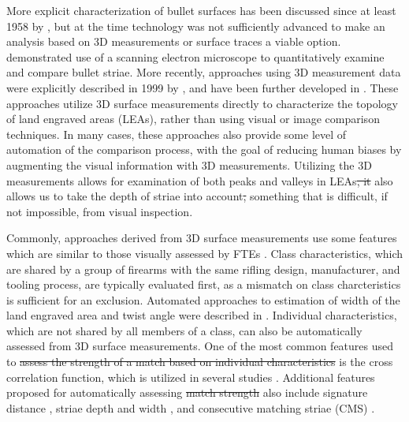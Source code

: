 \documentclass[doubleblind]{elsarticle}\usepackage[]{graphicx}\usepackage[]{color}
\providecommand{\DIFaddtex}[1]{{\protect\color{blue}\uwave{#1}}} %
\providecommand{\DIFdeltex}[1]{{\protect\color{red}\sout{#1}}}                      %
\providecommand{\DIFaddbegin}{} %
\providecommand{\DIFaddend}{} %
\providecommand{\DIFdelbegin}{} %
\providecommand{\DIFdelend}{} %
\providecommand{\DIFadd}[1]{\texorpdfstring{\DIFaddtex{#1}}{#1}} %
\providecommand{\DIFdel}[1]{\texorpdfstring{\DIFdeltex{#1}}{}} %
\newcommand{\DIFscaledelfig}{0.5}
\newlength{\DIFdelgraphicswidth} %
\newlength{\DIFdelgraphicsheight} %
\newcommand{\DIFaddincludegraphics}[2][]{{\color{blue}\fbox{\DIFOincludegraphics[#1]{#2}}}} %
\newcommand{\DIFdelincludegraphics}[2][]{%
\sbox{\DIFdelgraphicsbox}{\DIFOincludegraphics[#1]{#2}}%
\settoboxwidth{\DIFdelgraphicswidth}{\DIFdelgraphicsbox} %
\settoboxtotalheight{\DIFdelgraphicsheight}{\DIFdelgraphicsbox} %
\scalebox{\DIFscaledelfig}{%
\parbox[b]{\DIFdelgraphicswidth}{\usebox{\DIFdelgraphicsbox}\\[-\baselineskip] \rule{\DIFdelgraphicswidth}{0em}}\llap{\resizebox{\DIFdelgraphicswidth}{\DIFdelgraphicsheight}{%
\setlength{\unitlength}{\DIFdelgraphicswidth}%
\begin{picture}(1,1)%
\thicklines\linethickness{2pt} %
{\color[rgb]{1,0,0}\put(0,0){\framebox(1,1){}}}%
{\color[rgb]{1,0,0}\put(0,0){\line( 1,1){1}}}%
{\color[rgb]{1,0,0}\put(0,1){\line(1,-1){1}}}%
\end{picture}%
}\hspace*{3pt}}} %
} %
\DeclareRobustCommand{\DIFaddbegin}{\DIFOaddbegin \let\includegraphics\DIFaddincludegraphics} %
\DeclareRobustCommand{\DIFaddend}{\DIFOaddend \let\includegraphics\DIFOincludegraphics} %
\DeclareRobustCommand{\DIFdelbegin}{\DIFOdelbegin \let\includegraphics\DIFdelincludegraphics} %
\DeclareRobustCommand{\DIFdelend}{\DIFOaddend \let\includegraphics\DIFOincludegraphics} %
\begin{document}

More explicit characterization of bullet surfaces has been discussed since at least 1958 by \citeauthor{davis1968introduction} \cite{davis1968introduction}, but at the time technology was not sufficiently advanced to make an analysis based on 3D measurements or surface traces a viable option. \citet{ComputerIdentificationBullets1978} demonstrated use of a scanning electron microscope to quantitatively examine and compare bullet striae. More recently, approaches using 3D measurement data were explicitly described in 1999 by \citeauthor{dekinderAutomatedComparisonsBullet1999} \cite{dekinderAutomatedComparisonsBullet1999}, and have been further developed in \citep{bachrachDevelopment3DbasedAutomated2002,xieAutomatedBulletidentificationSystem2009, chuPilotStudyAutomated2010}. These approaches utilize 3D surface measurements directly to characterize the topology of land engraved areas (LEAs), rather than using visual or image comparison techniques. In many cases, these approaches also provide some level of automation of the comparison process, with the goal of reducing human biases by augmenting the visual information with 3D measurements. Utilizing the 3D measurements allows for examination of both peaks and valleys in LEAs\DIFdelbegin \DIFdel{, it }\DIFdelend \DIFaddbegin \DIFadd{. It }\DIFaddend also allows us to take the depth of striae into account\DIFdelbegin \DIFdel{, }\DIFdelend \DIFaddbegin \DIFadd{; }\DIFaddend something that is difficult, if not impossible, from visual inspection.

Commonly, approaches derived from 3D surface measurements use some features which are similar to those visually assessed by FTEs \citep{luAutomatedBulletIdentification2014}. Class characteristics, which are shared by a group of firearms with the same rifling design, manufacturer, and tooling process, are typically evaluated first, as a mismatch on class charcteristics is sufficient for an exclusion. Automated approaches to estimation of width of the land engraved area and twist angle were described in \citet{chuPilotStudyAutomated2010}. Individual characteristics, which are not shared by all members of a class, can also be automatically assessed from 3D surface measurements. One of the most common features used to \DIFdelbegin \DIFdel{assess the strength of a match based on individual characteristics }\DIFdelend \DIFaddbegin \DIFadd{describe the similarity of two surfaces }\DIFaddend is the cross correlation function, which is utilized in several studies \citep{maNISTBulletSignature2004, vorburgerApplicationsCrosscorrelationFunctions2011, chuPilotStudyAutomated2010}. Additional features proposed for automatically assessing \DIFdelbegin \DIFdel{match strength }\DIFdelend \DIFaddbegin \DIFadd{similarity }\DIFaddend also include signature distance \citep{maNISTBulletSignature2004}, striae depth and width \citep{ComputerIdentificationBullets1978}, and consecutive matching striae (CMS) \citep{chuAutomaticIdentificationBullet2013}.
\end{document}
